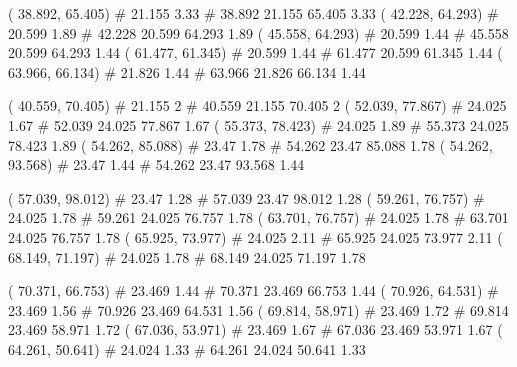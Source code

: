 \documentclass[a4paper,openbib,10pt]{article}
\newenvironment{treegraph}{\begin{graph}}{\end{graph}}
\begin{document}
\begin{treegraph}
  ( 38.892, 65.405) #     21.155    3.33
   #    38.892    21.155    65.405    3.33
  ( 42.228, 64.293) #     20.599    1.89
   #    42.228    20.599    64.293    1.89
  ( 45.558, 64.293) #     20.599    1.44
   #    45.558    20.599    64.293    1.44
  ( 61.477, 61.345) #     20.599    1.44
   #    61.477    20.599    61.345    1.44
  ( 63.966, 66.134) #     21.826    1.44
   #    63.966    21.826    66.134    1.44

  ( 40.559, 70.405) #     21.155    2
   #    40.559    21.155    70.405    2
  ( 52.039, 77.867) #     24.025    1.67
   #    52.039    24.025    77.867    1.67
  ( 55.373, 78.423) #     24.025    1.89
   #    55.373    24.025    78.423    1.89
  ( 54.262, 85.088) #     23.47    1.78
   #    54.262    23.47    85.088    1.78
  ( 54.262, 93.568) #     23.47    1.44
   #    54.262    23.47    93.568    1.44

  ( 57.039, 98.012) #     23.47    1.28
   #    57.039    23.47    98.012    1.28
  ( 59.261, 76.757) #     24.025    1.78
   #    59.261    24.025    76.757    1.78
  ( 63.701, 76.757) #     24.025    1.78
   #    63.701    24.025    76.757    1.78
  ( 65.925, 73.977) #     24.025    2.11
   #    65.925    24.025    73.977    2.11
  ( 68.149, 71.197) #     24.025    1.78
   #    68.149    24.025    71.197    1.78

  ( 70.371, 66.753) #     23.469    1.44
   #    70.371    23.469    66.753    1.44
  ( 70.926, 64.531) #     23.469    1.56
   #    70.926    23.469    64.531    1.56
  ( 69.814, 58.971) #     23.469    1.72
   #    69.814    23.469    58.971    1.72
  ( 67.036, 53.971) #     23.469    1.67
   #    67.036    23.469    53.971    1.67
  ( 64.261, 50.641) #     24.024    1.33
   #    64.261    24.024    50.641    1.33


\end{treegraph}
\end{document}
